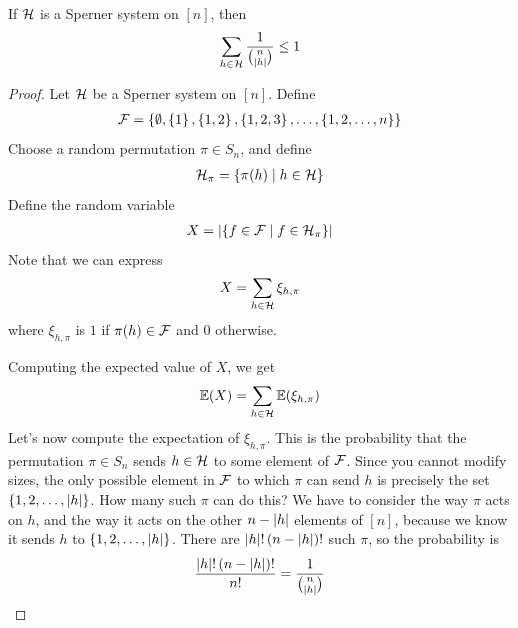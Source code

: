 \begin{boxlemma} \label{Ch3:Lemma:LYM}
    If $\mathcal{H}$ is a Sperner system on $[n]$, then
    \begin{align*}
        \sum_{h \in \mathcal{H}} \frac{1}{\binom{n}{\left\lvert h \right\rvert}} \leq 1
    \end{align*}
\end{boxlemma}
\begin{proof}
    Let $\mathcal{H}$ be a Sperner system on $[n]$. Define
    \begin{align*}
        \mathcal{F} = \left\{ \emptyset, \left\{ 1 \right\}, \left\{ 1, 2 \right\}, \left\{ 1, 2, 3 \right\}, \ldots, \left\{ 1, 2, \ldots, n \right\} \right\}
    \end{align*}
    Choose a random permutation $\pi \in S_n$, and define 
    \begin{align*}
        \mathcal{H}_{\pi} = \left\{ \pi(h) \; \middle\vert \; h \in \mathcal{H} \right\}
    \end{align*}
    Define the random variable
    \begin{align*}
        X = \left\lvert \left\{ f \in \mathcal{F} \; \middle\vert \; f \in \mathcal{H}_{\pi} \right\} \right\rvert
    \end{align*}
    Note that we can express
    \begin{align*}
        X = \sum_{h \in \mathcal{H}} \xi_{h, \pi}
    \end{align*}
    where $\xi_{h, \pi}$ is $1$ if $\pi(h) \in \mathcal{F}$ and $0$ otherwise.

    Computing the expected value of $X$, we get
    \begin{align*}
        \mathbb{E}\!\left( X \right) = \sum_{h \in \mathcal{H}} \mathbb{E}\!\left( \xi_{h, \pi} \right)
    \end{align*}
    Let's now compute the expectation of $\xi_{h, \pi}$. This is the probability that the permutation $\pi \in S_n$ sends $h \in \mathcal{H}$ to some element of $\mathcal{F}$. Since you cannot modify sizes, the only possible element in $\mathcal{F}$ to which $\pi$ can send $h$ is precisely the set $\left\{ 1, 2, \ldots, \left\lvert h \right\rvert \right\}$. How many such $\pi$ can do this? We have to consider the way $\pi$ acts on $h$, and the way it acts on the other $n - \left\lvert h \right\rvert$ elements of $[n]$, because we know it sends $h$ to $\left\{ 1, 2, \ldots, \left\lvert h \right\rvert \right\}$. There are $\left\lvert h \right\rvert! \left( n - \left\lvert h \right\rvert \right)!$ such $\pi$, so the probability is
    \begin{align*}
        \frac{\left\lvert h \right\rvert! \left( n - \left\lvert h \right\rvert \right)!}{n!} = \frac{1}{\binom{n}{\left\lvert h \right\rvert}}
    \end{align*}


\end{proof}

